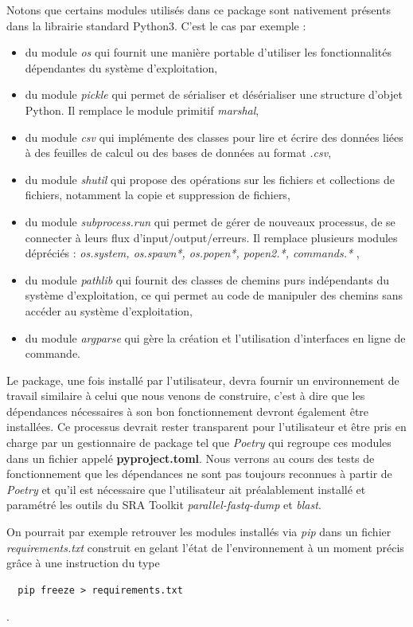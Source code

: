 \documentclass[twoside,a4paper,11pt,frenchb,openany]{report}
\begin{document}
Notons que certains modules utilisés dans ce package sont nativement présents dans la librairie standard Python3. C'est le cas par exemple :
\begin{itemize}
\item du module \textit{os} qui fournit une manière portable d'utiliser les fonctionnalités dépendantes du système d'exploitation,
\item du module \textit{pickle} qui permet de sérialiser et désérialiser une structure d'objet Python. Il remplace le module primitif \textit{marshal},
\item du module \textit{csv} qui implémente des classes pour lire et écrire des données liées à des feuilles de calcul ou des bases de données au format \textit{.csv},
\item du module \textit{shutil} qui propose des opérations sur les fichiers et collections de fichiers, notamment la copie et suppression de fichiers,
\item du module \textit{subprocess.run} qui permet de gérer de nouveaux processus, de se connecter à leurs flux d'input/output/erreurs. Il remplace plusieurs modules dépréciés : \textit{os.system, os.spawn*, os.popen*, popen2.*, commands.* },
\item du module \textit{pathlib} qui fournit des classes de chemins purs indépendants du système d'exploitation, ce qui permet au code de manipuler des chemins sans accéder au système d'exploitation,
\item du module \textit{argparse} qui gère la création et l'utilisation d'interfaces en ligne de commande.
\end{itemize}

Le package, une fois installé par l'utilisateur, devra fournir un environnement de travail similaire à celui que nous venons de construire, c'est à dire que les dépendances nécessaires à son bon fonctionnement devront également être installées. Ce processus devrait rester transparent pour l'utilisateur et être pris en charge par un gestionnaire de package tel que \textit{Poetry} qui regroupe ces modules dans un fichier appelé \textbf{pyproject.toml}. Nous verrons au cours des tests de fonctionnement que les dépendances ne sont pas toujours reconnues à partir de \textit{Poetry} et qu'il est nécessaire que l'utilisateur ait préalablement installé et paramétré les outils du SRA Toolkit \textit{parallel-fastq-dump} et \textit{blast}. 

On pourrait par exemple retrouver les modules installés via \textit{pip} dans un fichier \textit{requirements.txt} construit en gelant l'état de l'environnement à un moment précis grâce à une instruction du type
\begin{verbatim}  pip freeze > requirements.txt\end{verbatim}.
\end{document}
